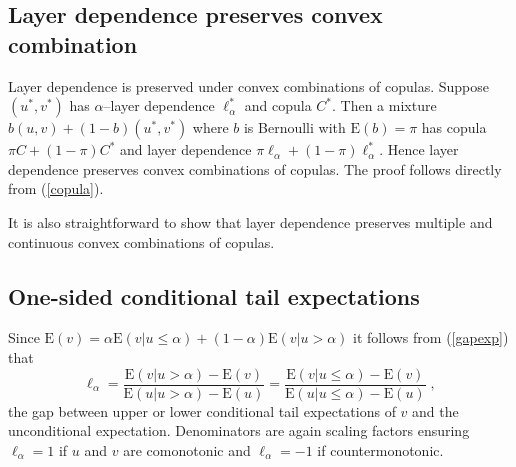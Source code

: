 \documentclass[authoryear]{elsarticle}
\newcommand{\E}{{\mathrm E}}
\newcommand{\de}{\mathrm{d}}
\newcommand{\eref}[1]{(\ref{#1})}
\begin{document}
\subsection{Layer dependence preserves convex combination}

Layer dependence is preserved under convex combinations of copulas.  Suppose $(u^*,v^*)$ has  $\alpha$--layer dependence $\ell_\alpha^*$ and copula $C^*$. Then a mixture $b(u,v)+(1-b)(u^*,v^*)$ where $b$ is Bernoulli with $\E(b)=\pi$ has  copula $\pi C+(1-\pi)C^*$ and layer dependence $\pi\ell_\alpha+(1-\pi)\ell_\alpha^*$. Hence layer dependence preserves convex combinations of copulas. The proof follows directly from \eref{copula}.

It is also straightforward to show that layer dependence preserves multiple and continuous convex combinations of copulas.



\subsection{One-sided conditional tail expectations}


Since $\E(v)=\alpha\E(v|u\leq \alpha)+(1-\alpha)\E(v|u>\alpha)$ it follows from \eref{gapexp} that
$$
\ell_\alpha = \frac{\E(v|u> \alpha)-\E(v)}{\E(u|u> \alpha)-\E(u)} = \frac{\E(v|u\leq \alpha)-\E(v)}{\E(u|u\leq \alpha)-\E(u)} \;,
$$
the gap between upper or lower conditional tail expectations of $v$ and the unconditional expectation. Denominators are again scaling factors ensuring $\ell_\alpha=1$ if $u$ and $v$ are comonotonic and $\ell_\alpha=-1$ if countermonotonic.

\end{document}
